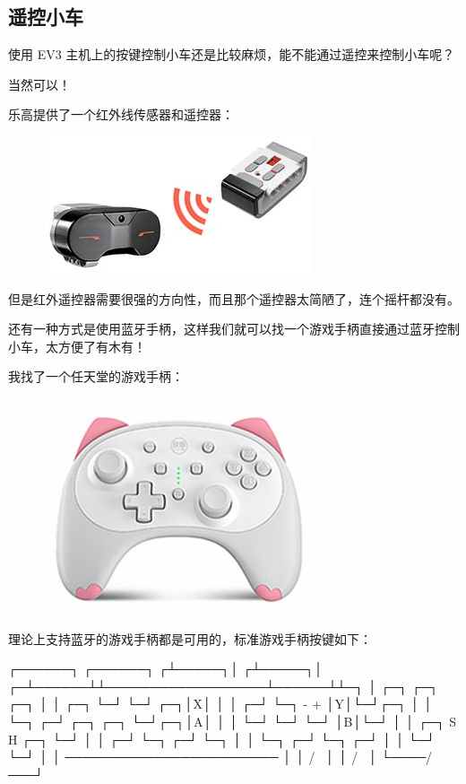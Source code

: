 \hypertarget{ux9065ux63a7ux5c0fux8f66}{%
\subsection{遥控小车}\label{ux9065ux63a7ux5c0fux8f66}}

使用 EV3 主机上的按键控制小车还是比较麻烦，能不能通过遥控来控制小车呢？

当然可以！

乐高提供了一个红外线传感器和遥控器：

 
 \begin{figure}[htp]
	\centering
	\includegraphics[width=0.6\linewidth]{fig/1346303361548354l.png}
\end{figure}


但是红外遥控器需要很强的方向性，而且那个遥控器太简陋了，连个摇杆都没有。

还有一种方式是使用蓝牙手柄，这样我们就可以找一个游戏手柄直接通过蓝牙控制小车，太方便了有木有！

我找了一个任天堂的游戏手柄：

 
 \begin{figure}[htp]
	\centering
	\includegraphics[width=0.6\linewidth]{fig/1346304282198081l.png}
\end{figure}


理论上支持蓝牙的游戏手柄都是可用的，标准游戏手柄按键如下：

\begin{pythoncode}
   ┌──────┐                   ┌──────┐
  ┌┴─────┐│                  ┌┴─────┐│
┌─┴──────┴┴──────────────────┴──────┴┴─┐
│               ┌─┐ ┌─┐         ┌─┐    │
│   ┌─┐         └─┘ └─┘      ┌─┐│X│    │
│ ┌─┘ └─┐        -   +       │Y│└─┘┌─┐ │
│ └─┐ ┌─┘       ┌─┐ ┌─┐      └─┘┌─┐│A│ │
│   └─┘         └─┘ └─┘         │B│└─┘ │
│         ┌─┐    S   H    ┌─┐   └─┘    │
│       ┌─┘ └─┐         ┌─┘ └─┐        │
│       └─┐ ┌─┘         └─┐ ┌─┘        │
│         └─┘             └─┘          │
│       ────────────────────────       │
│      /                        \      │
│     /                          \     │
└────/                            \────┘
\end{pythoncode}

